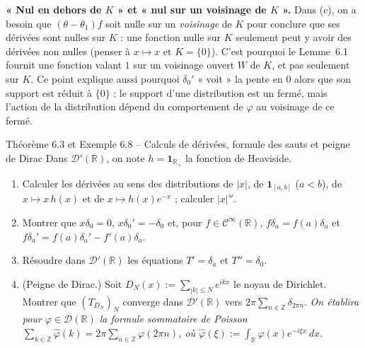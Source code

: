 \documentclass[11pt,a4paper]{article}
\newcommand{\R}{\mathbb{R}}
\newcommand{\Z}{\mathbb{Z}}
\newcommand{\Cinf}{\mathcal{C}^\infty}
\newcommand{\D}{\mathcal{D}}
\theoremstyle{definition}
\begin{document}
\begin{piege}
\textbf{« Nul en dehors de $K$ » et « nul sur un voisinage de $K$ ».} Dans (c), on a besoin que $(\theta-\theta_1)f$ soit nulle sur un \emph{voisinage} de $K$ pour conclure que ses dérivées sont nulles sur $K$ : une fonction nulle sur $K$ seulement peut y avoir des dérivées non nulles (penser à $x\mapsto x$ et $K=\{0\}$). C'est pourquoi le Lemme~6.1 fournit une fonction valant $1$ sur un voisinage ouvert $W$ de $K$, et pas seulement sur $K$. Ce point explique aussi pourquoi $\delta_0'$ « voit » la pente en $0$ alors que son support est réduit à $\{0\}$ : le support d'une distribution est un fermé, mais l'action de la distribution dépend du comportement de $\varphi$ au voisinage de ce fermé.
\end{piege}

\begin{exo}{Théorème 6.3 et Exemple 6.8 -- Calculs de dérivées, formule des sauts et peigne de Dirac}
Dans $\D'(\R)$, on note $h=\mathbf 1_{\R_+}$ la fonction de Heaviside.
\begin{enumerate}[label=(\alph*)]
  \item Calculer les dérivées au sens des distributions de $|x|$, de $\mathbf 1_{[a,b]}$ ($a<b$), de $x\mapsto x\,h(x)$ et de $x\mapsto h(x)e^{-x}$ ; calculer $|x|''$.
  \item Montrer que $x\delta_0=0$, $x\delta_0'=-\delta_0$ et, pour $f\in\Cinf(\R)$, $f\delta_a=f(a)\delta_a$ et $f\delta_a'=f(a)\delta_a'-f'(a)\delta_a$.
  \item Résoudre dans $\D'(\R)$ les équations $T'=\delta_a$ et $T''=\delta_0$.
  \item (Peigne de Dirac.) Soit $D_N(x):=\sum_{|k|\le N}e^{ikx}$ le noyau de Dirichlet. Montrer que $(T_{D_N})_N$ converge dans $\D'(\R)$ vers $2\pi\sum_{n\in\Z}\delta_{2\pi n}$. \emph{On établira pour $\varphi\in\D(\R)$ la formule sommatoire de Poisson $\sum_{k\in\Z}\hat\varphi(k)=2\pi\sum_{n\in\Z}\varphi(2\pi n)$, où $\hat\varphi(\xi):=\int_\R\varphi(x)e^{-i\xi x}\,dx$.}
\end{enumerate}
\end{exo}
\end{document}

